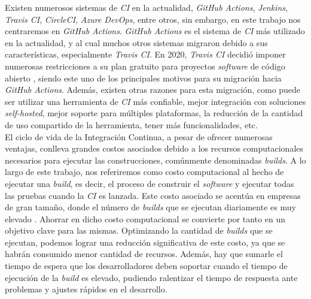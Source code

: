 Existen numerosos sistemas de \textit{CI} en la actualidad, \textit{GitHub Actions},
\textit{Jenkins}, \textit{Travis CI}, \textit{CircleCI}, \textit{Azure DevOps}, entre otros, sin
embargo, en este trabajo nos centraremos en \textit{GitHub Actions}. \textit{GitHub Actions} es
el sistema de \textit{CI} más utilizado en la actualidad, y al cual muchos otros sistemas
migraron debido a sus características, especialmente \textit{Travis CI}. En 2020, \textit{Travis
CI} decidió imponer numerosas restricciones a su plan gratuito para proyectos \textit{software}
de código abierto \cite{9}, siendo este uno de los principales motivos para su migración hacia
\textit{GitHub Actions}. Además, existen otras razones para esta migración, como puede ser
utilizar una herramienta de \textit{CI} más confiable, mejor integración con soluciones 
\textit{self-hosted}, mejor soporte para múltiples plataformas, la reducción de la cantidad de
uso compartido de la herramienta, tener más funcionalidades, etc.\\

El ciclo de vida de la Integración Continua, a pesar de ofrecer numerosas ventajas, conlleva
grandes costos asociados debido a los recursos computacionales \cite{10} necesarios para ejecutar
las construcciones, comúnmente denominadas \textit{builds}. A lo largo de este trabajo,
nos referiremos como costo computacional al hecho de ejecutar una \textit{build}, es decir, el
proceso de construir el \textit{software} y ejecutar todas las pruebas cuando la \textit{CI} es
lanzada. Este costo asociado se acentúa en empresas de gran tamaño, donde el número de
\textit{builds} que se ejecutan diariamente es muy elevado \cite{12,13}. Ahorrar en dicho costo
computacional se convierte por tanto en un objetivo clave para las mismas. Optimizando la cantidad
de \textit{builds} que se ejecutan, podemos lograr una reducción significativa de este costo, ya
que se habrán consumido menor cantidad de recursos. Además, hay que sumarle el tiempo de espera
que los desarrolladores deben soportar cuando el tiempo de ejecución de la \textit{build} es
elevado, pudiendo ralentizar el tiempo de respuesta ante problemas y ajustes rápidos en el
desarrollo.\\

